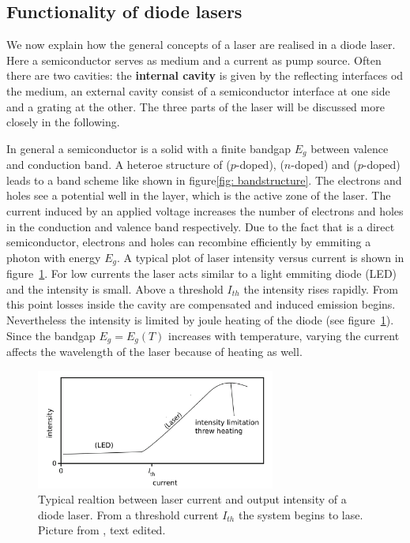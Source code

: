 \subsection{Functionality of diode lasers}
We now explain how the general concepts of a laser are realised in a diode laser. Here a semiconductor serves as medium and a current as pump source.
Often there are two cavities: the \textbf{internal cavity} is given by the reflecting interfaces od the medium, an external cavity consist of
a semiconductor interface at one side and a grating at the other. The three parts of the laser will be discussed more closely in the following.

In general a semiconductor is a solid with a finite bandgap $E_g$ between valence and conduction band. A heteroe structure of  ($p$-doped),
 ($n$-doped)
and  ($p$-doped) leads to a band scheme like shown in figure\ref{fig: bandstructure}. The electrons and holes see a potential well
in the  layer, which is the active zone of the laser. The current induced by an applied voltage increases the number of electrons
and holes in the conduction and valence band respectively. Due to the fact that  is a direct semiconductor, electrons and holes can
recombine efficiently by emmiting a photon with energy $E_g$. A typical plot of laser intensity versus current is shown in figure~\ref{fig: threshold}. For low
currents the laser acts similar to a light emmiting diode (LED) and the intensity is small. Above a threshold $I_{th}$ the intensity rises rapidly.
From this point losses inside the cavity are compensated and induced emission begins. Nevertheless the intensity is limited by joule heating
of the diode (see figure~\ref{fig: threshold}). Since the bandgap $E_g = E_g(T)$ increases with temperature, varying the current affects
the wavelength of the laser because of heating as well.

\begin{figure}
  \centering
  \includegraphics[width = 0.7\textwidth]{pics/threshold.png}
  \caption{Typical realtion between laser current and output intensity of a diode laser. From a threshold current 
  $I_{th}$ the system begins to lase. Picture from \cite{eichler}, text edited.}
  \label{fig: threshold}
\end{figure}

